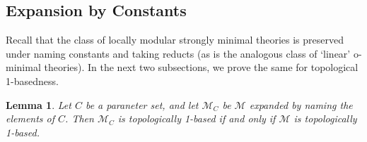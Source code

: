 \documentclass{amsart}
\newtheorem{lemma}[theorem]{Lemma}
\theoremstyle{definition}
\begin{document}
\subsection{Expansion by Constants}

Recall that the class of locally modular strongly minimal theories is preserved under naming constants and taking reducts (as is the analogous class of `linear' o-minimal theories). In the next two subsections, we prove the same for topological 1-basedness.

\begin{lemma}\label{L: constants}
Let $C$ be a paraneter set, and let $\mathcal M_C$ be $\mathcal M$ expanded by naming the elements of $C$. Then $\mathcal M_C$ is topologically 1-based if and only if $\mathcal M$ is topologically 1-based.
\end{lemma}
\end{document}
